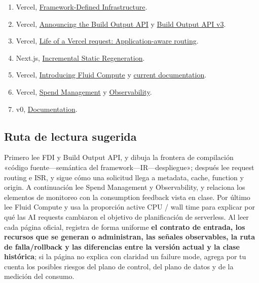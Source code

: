 \begin{enumerate}
  \item Vercel, \href{https://vercel.com/blog/framework-defined-infrastructure}{Framework-Defined Infrastructure}.
  \item Vercel, \href{https://vercel.com/blog/build-output-api}{Announcing the Build Output API} y \href{https://vercel.com/docs/build-output-api/v3}{Build Output API v3}.
  \item Vercel, \href{https://vercel.com/blog/life-of-a-request-application-aware-routing}{Life of a Vercel request: Application-aware routing}.
  \item Next.js, \href{https://nextjs.org/docs/app/guides/incremental-static-regeneration}{Incremental Static Regeneration}.
  \item Vercel, \href{https://vercel.com/blog/introducing-fluid-compute}{Introducing Fluid Compute} y \href{https://vercel.com/docs/fluid-compute}{current documentation}.
  \item Vercel, \href{https://vercel.com/docs/spend-management}{Spend Management} y \href{https://vercel.com/docs/observability}{Observability}.
  \item v0, \href{https://v0.app/docs}{Documentation}.
\end{enumerate}

\subsection{Ruta de lectura sugerida}

Primero lee FDI y Build Output API, y dibuja la frontera de compilación «código fuente—semántica del framework—IR—despliegue»; después lee request routing e ISR, y sigue cómo una solicitud llega a metadata, cache, function y origin. A continuación lee Spend Management y Observability, y relaciona los elementos de monitoreo con la consumption feedback vista en clase. Por último lee Fluid Compute y usa la proporción active CPU / wall time para explicar por qué las AI requests cambiaron el objetivo de planificación de serverless. Al leer cada página oficial, registra de forma uniforme \textbf{el contrato de entrada, los recursos que se generan o administran, las señales observables, la ruta de falla/rollback y las diferencias entre la versión actual y la clase histórica}; si la página no explica con claridad un failure mode, agrega por tu cuenta los posibles riesgos del plano de control, del plano de datos y de la medición del consumo.


